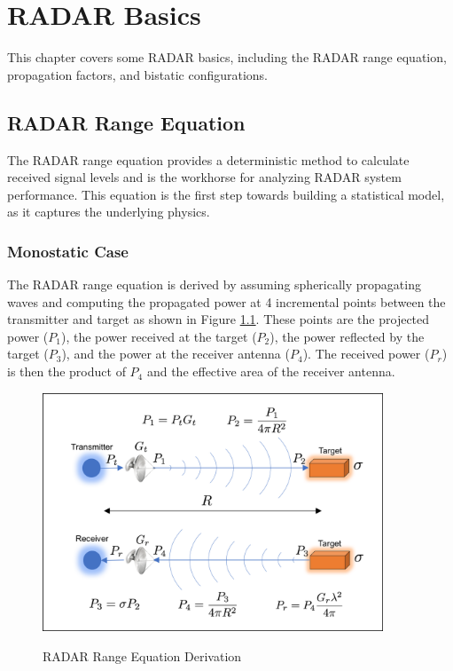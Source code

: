 \chapter{RADAR Basics}\label{chapter_radar_basics}
This chapter covers some RADAR basics, including the RADAR range equation, propagation factors, and bistatic configurations.

\section{RADAR Range Equation} 
The RADAR range equation provides a deterministic method to calculate received signal levels and is the workhorse for analyzing RADAR system performance. This equation is the first step towards building a statistical model, as it captures the underlying physics.

\subsection{Monostatic Case}
The RADAR range equation is derived by assuming spherically propagating waves and computing the propagated power at 4 incremental points between the transmitter and target as shown in Figure \ref{intro_fig:1}. These points are the projected power ($P_1$), the power received at the target ($P_2$), the power reflected by the target ($P_3$), and the power at the receiver antenna ($P_4$). The received power ($P_r$) is then the product of $P_4$ and the effective area of the receiver antenna.

\begin{figure}[H]
  \begin{center}
\includegraphics[width=4in]{../media/multistatic/radar_range_equation.png}
  \end{center}
  \renewcommand{\baselinestretch}{1} \small\normalsize
  \begin{quote}
    \caption[RADAR Range Equation Derivation]{RADAR Range Equation Derivation \label{intro_fig:1}}
  \end{quote}
\end{figure}
\renewcommand{\baselinestretch}{2} \small\normalsize


